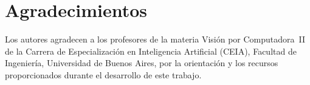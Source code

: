 \documentclass[conference,a4paper]{IEEEtran}[2015/08/26]
\begin{document}
\section*{Agradecimientos}

Los autores agradecen a los profesores de la materia Visión por Computadora~II de la Carrera de Especialización en Inteligencia Artificial (CEIA), Facultad de Ingeniería, Universidad de Buenos Aires, por la orientación y los recursos proporcionados durante el desarrollo de este trabajo.



\end{document}
